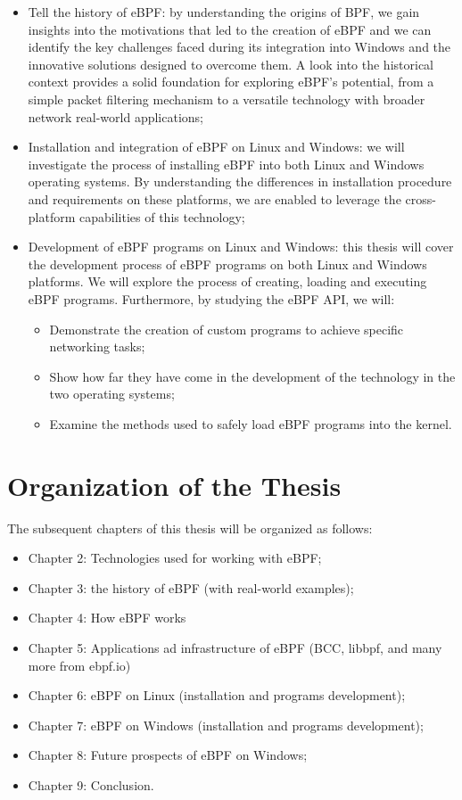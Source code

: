 \begin{itemize}
	\item Tell the history of eBPF: by understanding the origins of BPF, we gain insights into the 		
		motivations that led to the creation of eBPF and we can identify the key challenges faced during its integration into Windows and the innovative solutions designed to overcome them. 
		A look into the historical context provides a solid foundation for exploring eBPF's potential, from a simple packet filtering mechanism to a versatile technology with broader network real-world applications;
	\item Installation and integration of eBPF on Linux and Windows: we will investigate the process of
		installing eBPF into both Linux and Windows operating systems. 
		By understanding the differences in installation procedure and requirements on these platforms, we are enabled to leverage the cross-platform capabilities of this technology;
	\item Development of eBPF programs on Linux and Windows: this thesis will cover the development
		process of eBPF programs on both Linux and Windows platforms. 
		We will explore the process of creating, loading and executing eBPF programs.
		Furthermore, by studying the eBPF API, we will:
		\begin{itemize}
			\item Demonstrate the creation of custom programs to achieve specific networking tasks;
			\item Show how far they have come in the development of the technology in the two operating
				systems;
			\item Examine the methods used to safely load eBPF programs into the kernel. 
		\end{itemize}
\end{itemize}

\section{Organization of the Thesis}


The subsequent chapters of this thesis will be organized as follows:

\begin{itemize}
	\item Chapter 2: Technologies used for working with eBPF;
	\item Chapter 3: the history of eBPF (with real-world examples);
	\item Chapter 4: How eBPF works
	\item Chapter 5: Applications ad infrastructure of eBPF (BCC, libbpf, and many more from ebpf.io)
	\item Chapter 6: eBPF on Linux (installation and programs development);
	\item Chapter 7: eBPF on Windows (installation and programs development);
	\item Chapter 8: Future prospects of eBPF on Windows;
	\item Chapter 9: Conclusion.
\end{itemize}

